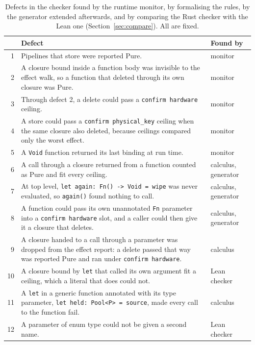 \documentclass[11pt,a4paper]{article}
\newcommand{\nsl}[1]{\texttt{#1}}
\begin{document}
\begin{table}[t]
\centering
\small
\begin{tabularx}{\linewidth}{@{}rXl@{}}
\toprule
& Defect & Found by \\
\midrule
1 & Pipelines that store were reported Pure. & monitor \\
2 & A closure bound inside a function body was invisible to the effect walk, so a function that deleted through its own closure was Pure. & monitor \\
3 & Through defect 2, a delete could pass a \nsl{confirm hardware} ceiling. & monitor \\
4 & A store could pass a \nsl{confirm physical\_key} ceiling when the same closure also deleted, because ceilings compared only the worst effect. & monitor \\
5 & A \nsl{Void} function returned its last binding at run time. & monitor \\
6 & A call through a closure returned from a function counted as Pure and fit every ceiling. & calculus, generator \\
7 & At top level, \nsl{let again: Fn() -> Void = wipe} was never evaluated, so \nsl{again()} found nothing to call. & calculus, generator \\
8 & A function could pass its own unannotated \nsl{Fn} parameter into a \nsl{confirm hardware} slot, and a caller could then give it a closure that deletes. & calculus, generator \\
9 & A closure handed to a call through a parameter was dropped from the effect report: a delete passed that way was reported Pure and ran under \nsl{confirm hardware}. & calculus \\
10 & A closure bound by \nsl{let} that called its own argument fit a ceiling, which a literal that does could not. & Lean checker \\
11 & A \nsl{let} in a generic function annotated with its type parameter, \nsl{let held: Pool<P> = source}, made every call to the function fail. & calculus \\
12 & A parameter of enum type could not be given a second name. & Lean checker \\
\bottomrule
\end{tabularx}
\caption{Defects in the checker found by the runtime monitor, by
formalising the rules, by the generator extended afterwards, and by
comparing the Rust checker with the Lean one
(Section~\ref{sec:compare}). All are fixed.}
\label{tab:defects}
\end{table}
\end{document}
